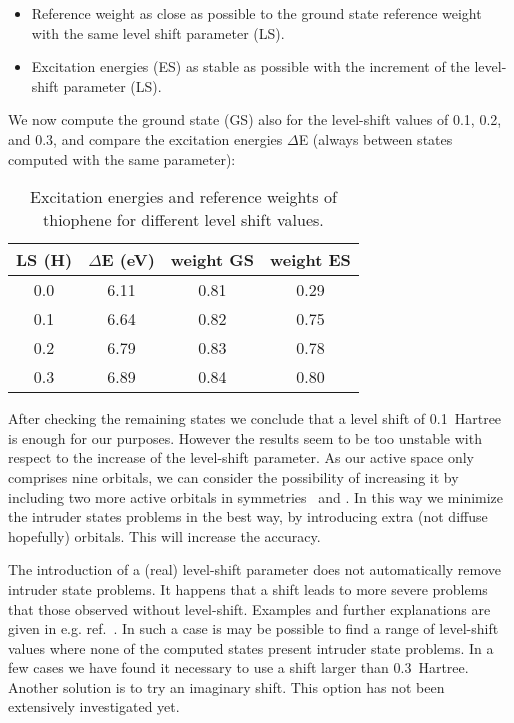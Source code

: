 \begin{itemize}
\item Reference weight as close as possible to the ground state reference weight
      with the same level shift parameter (LS).
\item Excitation energies (ES) as stable as possible with the increment of the
      level-shift parameter (LS).
\end{itemize}

We now compute the ground state (GS) also for the level-shift values of 0.1, 0.2,
and 0.3, and compare the excitation energies $\Delta$E (always between states 
computed with the same parameter):

\begin{table}[ht]
\begin{center}
\caption{\label{tab:thiols}Excitation energies and reference weights of thiophene 
for different level shift values.}
\begin{tabular}{cccc}
\\
LS (H) & $\Delta$E (eV) & weight GS & weight ES \\
\hline
0.0 & 6.11 & 0.81 & 0.29 \\
0.1 & 6.64 & 0.82 & 0.75 \\
0.2 & 6.79 & 0.83 & 0.78 \\
0.3 & 6.89 & 0.84 & 0.80 \\
\hline
\end{tabular}
\end{center}
\end{table}

After checking the remaining states we conclude that a level shift
of 0.1~Hartree is enough for our purposes. However the results
seem to be too unstable with respect to the increase of the level-shift
parameter. As our active space only comprises nine orbitals, we can consider the
possibility of increasing it by including two more active orbitals in 
symmetries \bo\ and \at. In this way we minimize the intruder states
problems in the best way, by introducing extra (not diffuse hopefully)
orbitals. This will increase the accuracy. 


The introduction of a (real) level-shift parameter does not automatically
remove intruder state problems. It happens that a shift leads to more
severe problems that those observed without level-shift. Examples
and further explanations are given in e.g. ref.~\cite{Roos:96a}.
In such a case is  may be possible to find a range of level-shift values
where none of the computed states present intruder state problems. 
In a few cases we have found it necessary to use a shift larger than 
0.3~Hartree. Another solution is to try an imaginary shift. This option has 
not been extensively investigated yet.

